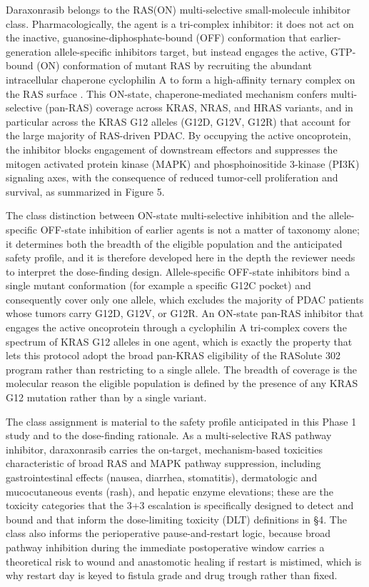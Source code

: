 Daraxonrasib belongs to the RAS(ON) multi-selective small-molecule inhibitor class.
Pharmacologically, the agent is a tri-complex inhibitor: it does not act on the
inactive, guanosine-diphosphate-bound (OFF) conformation that earlier-generation
allele-specific inhibitors target, but instead engages the active, GTP-bound (ON)
conformation of mutant RAS by recruiting the abundant intracellular chaperone
cyclophilin A to form a high-affinity ternary complex on the RAS surface
\cite{daraxwhipple, onpremwhippl}. This ON-state, chaperone-mediated mechanism
confers multi-selective (pan-RAS) coverage across KRAS, NRAS, and HRAS variants,
and in particular across the KRAS G12 alleles (G12D, G12V, G12R) that account for
the large majority of RAS-driven PDAC. By occupying the active oncoprotein, the
inhibitor blocks engagement of downstream effectors and suppresses the mitogen
activated protein kinase (MAPK) and phosphoinositide 3-kinase (PI3K) signaling
axes, with the consequence of reduced tumor-cell proliferation and survival, as
summarized in Figure 5.

The class distinction between ON-state multi-selective inhibition and the
allele-specific OFF-state inhibition of earlier agents is not a matter of taxonomy
alone; it determines both the breadth of the eligible population and the anticipated
safety profile, and it is therefore developed here in the depth the reviewer needs
to interpret the dose-finding design. Allele-specific OFF-state inhibitors bind a
single mutant conformation (for example a specific G12C pocket) and consequently
cover only one allele, which excludes the majority of PDAC patients whose tumors
carry G12D, G12V, or G12R. An ON-state pan-RAS inhibitor that engages the active
oncoprotein through a cyclophilin A tri-complex covers the spectrum of KRAS G12
alleles in one agent, which is exactly the property that lets this protocol adopt the
broad pan-KRAS eligibility of the RASolute 302 program rather than restricting to a
single allele. The breadth of coverage is the molecular reason the eligible
population is defined by the presence of any KRAS G12 mutation rather than by a
single variant.

The class assignment is material to the safety profile anticipated in this Phase 1
study and to the dose-finding rationale. As a multi-selective RAS pathway
inhibitor, daraxonrasib carries the on-target, mechanism-based toxicities
characteristic of broad RAS and MAPK pathway suppression, including
gastrointestinal effects (nausea, diarrhea, stomatitis), dermatologic and
mucocutaneous events (rash), and hepatic enzyme elevations; these are the toxicity
categories that the 3+3 escalation is specifically designed to detect and bound and
that inform the dose-limiting toxicity (DLT) definitions in \S 4. The class also
informs the perioperative pause-and-restart logic, because broad pathway inhibition
during the immediate postoperative window carries a theoretical risk to wound and
anastomotic healing if restart is mistimed, which is why restart day is
keyed to fistula grade and drug trough rather than fixed.

